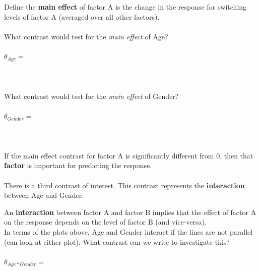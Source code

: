 Define the \textbf{main effect} of factor A is the change in the response for switching levels of factor A (averaged over all other factors).\\~\\
What contrast would test for the \textit{main effect} of Age?\\~\\
$\theta_{Age} = $\\~\\~\\~\\
What contrast would test for the \textit{main effect} of Gender?\\~\\
$\theta_{Gender} = $\\~\\~\\~\\
If the main effect contrast for factor A is significantly different from 0, then that \textbf{factor} is important for predicting the response. \\~\\
There is a third contrast of interest.  This contrast represents the \textbf{interaction} between Age and Gender.

\newpage

An \textbf{interaction} between factor A and factor B implies that the effect of factor A on the response depends on the level of factor B (and vice-versa).\\

In terms of the plots above, Age and Gender interact if the lines are not parallel (can look at either plot).  What contrast can we write to investigate this?\\~\\
$\theta_{Age*Gender} = $\\~\\~\\~\\

